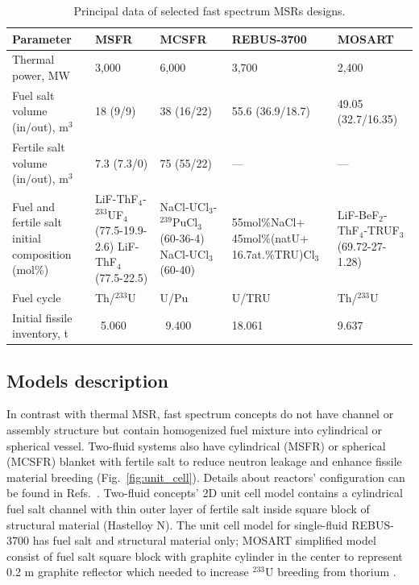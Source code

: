 \documentclass{anstrans}
\begin{document}
\begin{table}[!htb]
	\vspace{-0.15in}
  \centering
  \caption{Principal data of selected fast spectrum \glspl{MSR} designs.}
  \label{table:fsmsr_concepts} 
  \begin{tabular}{p{} p{} p{} p{} p{}} \toprule 
   Parameter & \gls{MSFR} & \gls{MCSFR} & REBUS-3700 & \gls{MOSART} \\ \midrule
   Thermal power, MW 				&  3,000 & 6,000     & 3,700 & 2,400   \\ 
   Fuel salt volume (in/out), m$^3$       &18 (9/9)& 38 (16/22)& 55.6 (36.9/18.7) & 49.05 (32.7/16.35) \\ 
   Fertile salt volume (in/out), m$^3$ & 7.3 (7.3/0) & 75 (55/22)    & --- & --- \\
   Fuel and fertile salt initial composition (mol\%) & LiF-ThF$_4$-$^{233}$UF$_4$ (77.5-19.9-2.6) LiF-ThF$_4$ \newline (77.5-22.5) & NaCl-UCl$_3$-$^{239}$PuCl$_3$ (60-36-4) \newline NaCl-UCl$_3$ \newline (60-40)    
   & 55mol\%NaCl+ 45mol\%(natU+ 16.7at.\%TRU)Cl$_3$ 
   & LiF-BeF$_2$-ThF$_4$-TRUF$_3$  \newline (69.72-27-1.28) \\
   Fuel cycle & Th/$^{233}$U & U/Pu  & U/TRU & Th/$^{233}$U \\
   Initial fissile inventory, t & \ 5.060 & \ 9.400    & 18.061 & 9.637 \\ \bottomrule 
   \end{tabular}
   \vspace{-0.2in}
\end{table}

\subsection{Models description} 
\label{sec:model}
In contrast with thermal \gls{MSR}, fast spectrum concepts do not have channel or assembly structure but contain homogenized fuel mixture into cylindrical or spherical vessel. Two-fluid systems also have cylindrical (\gls{MSFR}) or spherical (\gls{MCSFR}) blanket with fertile salt to reduce neutron leakage and enhance fissile material breeding (Fig.~\ref{fig:unit_cell}). Details about reactors' configuration can be found in Refs.~\cite{noauthor_final_2015, simmons_assessment_1974, mourogov_potentialities_2006,ignatiev_molten_2014}. Two-fluid concepts' 2D unit cell model contains a cylindrical fuel salt channel with thin outer layer of fertile salt inside square block of structural material (Hastelloy N). The unit cell model for single-fluid REBUS-3700 has fuel salt and structural material only; \gls{MOSART} simplified model consist of fuel salt square block with graphite cylinder in the center to represent 0.2 m graphite reflector which needed to increase $^{233}$U breeding from thorium \cite{anshuman_chaube_arfc/mosart:_2018}. 
\end{document}
